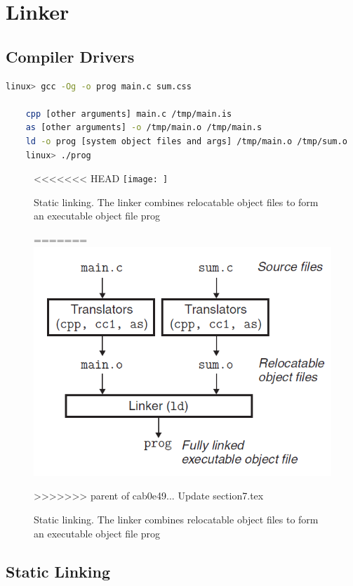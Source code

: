 \chapter{Linker}

\section{Compiler Drivers}



\begin{lstlisting}[language=bash]
    linux> gcc -Og -o prog main.c sum.css

    cpp [other arguments] main.c /tmp/main.is
    as [other arguments] -o /tmp/main.o /tmp/main.s
    ld -o prog [system object files and args] /tmp/main.o /tmp/sum.o
    linux> ./prog
\end{lstlisting}

\begin{figure}[h!]
    \centering
<<<<<<< HEAD
    \texttt{[image: ]}
    \caption{Static linking. The linker combines relocatable object files to form an executable object file prog}
=======
    \includegraphics[scale=0.5]{pic/section7/pic1.png}
    \caption{Static linking. The linker combines relocatable    object files to form an executable object file prog}
>>>>>>> parent of cab0e49... Update section7.tex
\end{figure}



\section{Static Linking}

